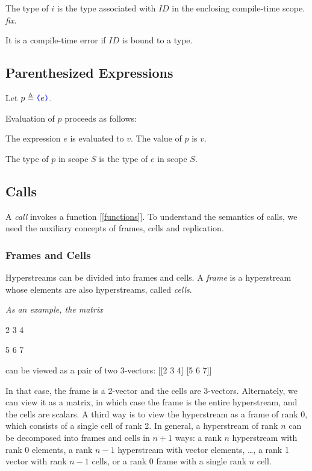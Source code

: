 \documentclass{article}
\begin{document}
The type of $i$ is the type associated with $ID$ in the enclosing compile-time scope. {\em fix}.

It is a compile-time error if $ID$ is bound to a type. 


\subsection{Parenthesized Expressions}
\label{parenthesizedExpressions}

\ParenthesizedExpression{}

Let $p \triangleq \texttt{\color{blue} (}{}e \texttt{\color{blue} )}{}$.

Evaluation of $p$ proceeds as follows:

The expression $e$ is evaluated to $v$. The value of $p$ is $v$.

The type of $p$ in scope $S$ is the type of $e$ in scope $S$.

\subsection{Calls}
\label{calls}

A {\em call} invokes a function [\ref{functions}]. To understand the semantics of calls, we need the auxiliary concepts of frames, cells and replication.


\subsubsection{Frames and Cells}
\label{framesAndCells}

Hyperstreams can be divided into frames and cells. A {\em frame} is a hyperstream whose elements are also hyperstreams, called {\em cells}.

{\em As an example, the matrix 

2 3 4

5 6 7

 can be viewed as a pair of two 3-vectors:
[[2 3 4] [5 6 7]]

In that case, the frame is a 2-vector and the cells are 3-vectors.  Alternately, we can view it as a matrix, in which case the frame is the entire hyperstream, and the cells are scalars. A third way is to view the hyperstream as a frame of rank 0, which consists of a single cell of rank 2. In general, a hyperstream of rank $n$ can be decomposed into frames and cells in $n+1$ ways: a rank $n$ hyperstream with rank 0 elements, a rank $n-1$ hyperstream with vector elements, …, a rank 1 vector with rank $n-1$ cells, or a rank 0 frame with a single rank $n$ cell.
}
\end{document}
